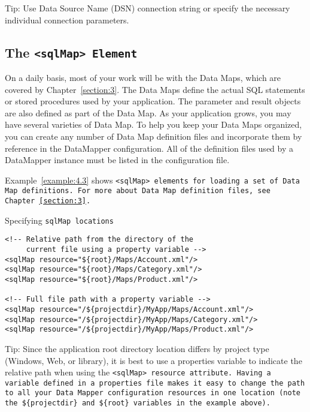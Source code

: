 \begin{mybox}{Tip:}
   Use Data Source Name (DSN) connection string or specify the
   necessary individual connection parameters.
\end{mybox}

\subsection{The \tt{<sqlMap>} Element}
On a daily basis, most of your work will be with the Data Maps, which are
covered by Chapter~\ref{section:3}. The Data Maps define the actual SQL
statements or stored procedures used by your application. The parameter and
result objects are also defined as part of the Data Map. As your application
grows, you may have several varieties of Data Map. To help you keep your Data
Maps organized, you can create any number of Data Map definition files and
incorporate them by reference in the DataMapper configuration. All of the
definition files used by a DataMapper instance must be listed in the
configuration file.

Example~\ref{example:4.3} shows \tt{<sqlMap>} elements for loading a set of
Data Map definitions. For more about Data Map definition files, see
Chapter~\ref{section:3}.

\begin{example}\label{example:4.3}
Specifying \tt{sqlMap} locations
\begin{verbatim}
<!-- Relative path from the directory of the
     current file using a property variable -->
<sqlMap resource="${root}/Maps/Account.xml"/>
<sqlMap resource="${root}/Maps/Category.xml"/>
<sqlMap resource="${root}/Maps/Product.xml"/>

<!-- Full file path with a property variable -->
<sqlMap resource="/${projectdir}/MyApp/Maps/Account.xml"/>
<sqlMap resource="/${projectdir}/MyApp/Maps/Category.xml"/>
<sqlMap resource="/${projectdir}/MyApp/Maps/Product.xml"/>
\end{verbatim}
\end{example}

\begin{mybox}{Tip:}
Since the application root directory location differs by project type
(Windows, Web, or library), it is best to use a properties variable to
indicate the relative path when using the \tt{<sqlMap>} \tt{resource}
attribute. Having a variable defined in a properties file makes it easy to
change the path to all your Data Mapper configuration resources in one
location (note the \tt{\$\{projectdir\}} and \tt{\$\{root\}} variables in the
example above).
\end{mybox}
